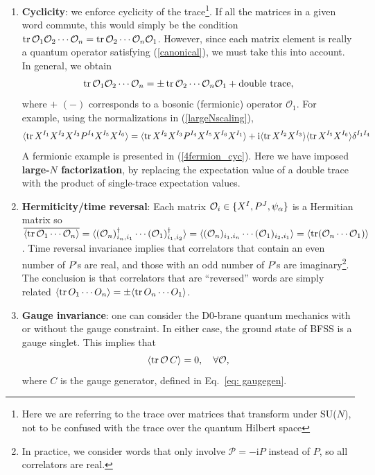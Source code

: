 \documentclass[11pt]{article}
\def\nref#1{(\ref{#1})}
\renewcommand{\ev}[1]{\langle #1 \rangle} %
\def\i{\mathrm{i}}
\begin{document}
\begin{enumerate}
    \item {\bf Cyclicity}: we enforce cyclicity of the trace\footnote{Here we are referring to the trace over matrices that transform under SU($N$), not to be confused with the trace over the quantum Hilbert space}. If all the matrices in a given word commute, this would simply be the condition $\tr \mathcal{O}_1 \mathcal{O}_2 \cdots \mathcal{O}_n = \tr \mathcal{O}_2 \cdots \mathcal{O}_n \mathcal{O}_1 $. However, since each matrix element is really a quantum operator satisfying \nref{canonical}, we must take this into account. In general, we obtain %
    \begin{align} \label{eq: cyc}
        \tr \mathcal{O}_1 \mathcal{O}_2 \cdots \mathcal{O}_n = \pm \tr \mathcal{O}_2 \cdots \mathcal{O}_n \mathcal{O}_1 + \text{double trace} ,
    \end{align}
    where $+$ $(-)$ corresponds to a bosonic (fermionic) operator $\mathcal{O}_1$. For example, using the normalizations in \nref{largeNscaling},
    \begin{align} \label{eq: exampleCyc}
       \ev{ \tr X^{I_1}  X^{I_2} X^{I_3} P^{I_4} X^{I_5} X^{I_6}}  = \ev{\tr   X^{I_2} X^{I_3} P^{I_4} X^{I_5} X^{I_6} X^{I_1}} + \i \ev{\tr X^{I_2} X^{I_3}} \ev{\tr X^{I_5} X^{I_6}} \delta^{I_1 I_4} 
    \end{align}
    A fermionic example is presented in (\ref{4fermion_cyc}). Here we have imposed {\bf  large-$N$ factorization}, by replacing the expectation value of a double trace with the product of single-trace expectation values.  %

    \item {\bf Hermiticity/time reversal}: Each matrix $\mathcal{O}_i \in \{X^I,P^J,\psi_\alpha \}$ is a Hermitian matrix so $\overline{\ev{\tr \O_1  \cdots \O_n}} = \ev{(\O_n)_{i_n,i_1}^\dagger  \cdots (\O_1)_{i_1, i_2}^\dagger } = \ev{(\O_n)_{i_1, i_n} \cdots (\O_1)_{i_2,i_1}} = \ev{\tr (\O_n \cdots \O_1 )}$. Time reversal invariance implies that correlators that contain an even number of $P$'s are real, and those with an odd number of $P$'s are imaginary\footnote{In practice, we consider words that only involve $\mathcal{P} = - \mathrm{i} P$ instead of $P$, so all correlators are real.}. The conclusion is that correlators that are ``reversed'' words are simply related $\ev{\tr O_1 \cdots O_n} = \pm \ev{\tr O_n \cdots O_1}$.

    \item {\bf Gauge invariance}: one can consider the D0-brane quantum mechanics with or without \cite{Maldacena:2018vsr} the gauge constraint. In either case, the ground state of BFSS is a gauge singlet. This implies that 
    \begin{equation} \label{eq: gaugeConstraint}
        \langle \tr  \mathcal{O} \, C \rangle = 0,\quad \forall \mathcal{O},
    \end{equation}
    where $C$ is the gauge generator, defined in Eq.~\eqref{eq: gaugegen}.
\end{enumerate}
\end{document}

